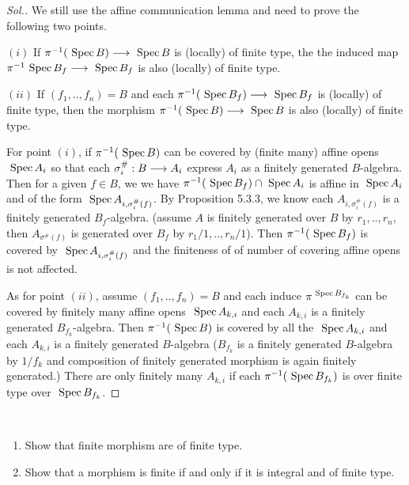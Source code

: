 \documentclass[11pt]{book} %
\begin{document}
\begin{proof}[Sol.]
We still use the affine communication lemma and need to prove the following two points.

$(i)$ If $\pi^{-1}(\text{ Spec\,} B)\longrightarrow \text{ Spec\,} B$ is (locally) of finite type, the the induced map $\pi^{-1}\text{ Spec\,} B_f\longrightarrow \text{ Spec\,} B_f$ is also (locally) of finite type.

$(ii)$ If $(f_1,..,f_n)=B$ and each $\pi^{-1}(\text{ Spec\,} B_f)\longrightarrow\text{ Spec\,} B_f$ is (locally) of finite type, then the morphism $\pi^{-1}(\text{ Spec\,} B)\longrightarrow \text{ Spec\,} B$ is also (locally) of finite type.

For point  $(i)$, if $\pi^{-1}(\text{ Spec\,} B)$ can be covered by (finite many) affine opens $\text{ Spec\,} A_i$ so that each $\sigma_i^\#:B\longrightarrow A_i$ express $A_i$ as a finitely generated $B$-algebra. Then for a given $f\in B$, we we have $\pi^{-1}(\text{ Spec\,} B_f)\cap \text{ Spec\,} A_i$ is affine in $\text{ Spec\,} A_i$ and of the form $\text{ Spec\,} A_{i,\sigma_i^\#(f)}$. By Proposition 5.3.3, we know each $A_{i,\sigma_i^\#(f)}$  is a finitely generated $B_f$-algebra. (assume $A$ is finitely generated over $B$ by $r_1,..,r_n$, then $A_{\sigma^\#(f)}$ is generated over $B_f$ by $r_1/1,..,r_n/1$). Then $\pi^{-1}(\text{ Spec\,} B_f)$ is covered by $\text{ Spec\,} A_{i,\sigma_i^\#(f)}$ and the finiteness of of number of covering affine opens is not affected.

As for point $(ii)$, assume $(f_1,..,f_n)=B$ and each induce $\pi^{\text{ Spec\,} B_{f_k}}$ can be covered by finitely many affine opens $\text{ Spec\,} A_{k,i}$ and each $A_{k,i}$ is a finitely generated $B_{f_k}$-algebra. Then $\pi^{-1}(\text{ Spec\,} B)$ is covered by all the $\text{ Spec\,} A_{k,i}$ and each $A_{k,i}$ is a finitely generated $B$-algebra ($B_{f_k}$ is a finitely generated $B$-algebra by $1/f_{k}$ and composition of finitely generated morphism is again finitely generated.) There are only finitely many $A_{k,i}$ if each $\pi^{-1}(\text{ Spec\,} B_{f_k})$ is over finite type over $\text{ Spec\,} B_{f_k}$.
\end{proof}
\begin{exr}\label{chap7exr:finite=integral+finite_type}
\ 
\begin{enumerate}[label=(\alph*)]
\item Show that finite morphism are of finite type.
\item Show that a morphism  is finite  if and only if it is integral and of finite type.
\end{enumerate}
\end{exr}
\end{document}
